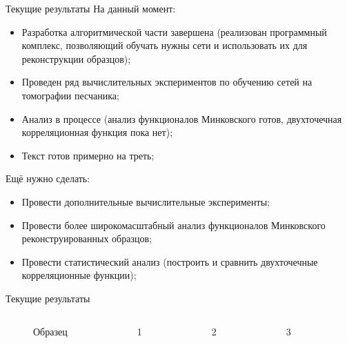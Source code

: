 \documentclass[10pt, handout, aspectratio=169]{beamer}
\begin{document}
	\begin{frame}{Текущие результаты}
		На данный момент:
		\begin{itemize}
			\item Разработка алгоритмической части завершена (реализован программный комплекс, позволяющий обучать нужны сети и использовать их для реконструкции образцов);
			\item Проведен ряд вычислительных экспериментов по обучению сетей на томографии песчаника;
			\item Анализ в процессе (анализ функционалов Минковского готов, двухточечная корреляционная функция пока нет);
			\item Текст готов примерно на треть;
		\end{itemize}
		Ещё нужно сделать:
		\begin{itemize}
			\item Провести дополнительные вычислительные эксперименты;
			\item Провести более широкомасштабный анализ функционалов Минковского реконструированных образцов;
			\item Провести статистический анализ (построить и сравнить двухточечные корреляционные функции);
		\end{itemize}
	\end{frame}

	\begin{frame}{Текущие результаты}
		\begin{columns}
			\begin{figure}
				\caption{Образец}
			\end{figure}
			\begin{figure}
				\caption{1}
			\end{figure}
			\begin{figure}
				\caption{2}
			\end{figure}
			\begin{figure}
				\caption{3}
			\end{figure}
		\end{columns}
		\vfill
	\end{frame}
\end{document}
